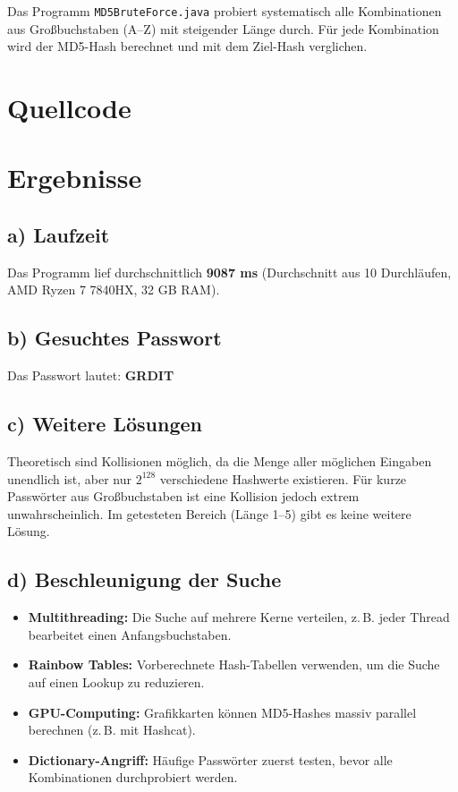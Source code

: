 \documentclass[
	fontsize=12pt,
	paper=a4,
	numbers=noenddot,
	listof=totoc,
	listof=entryprefix,
	listof=nochaptergap,
	bibliography=totoc,
	parskip=half,
	openany
]{scrbook}
\begin{document}
Das Programm \texttt{MD5BruteForce.java} probiert systematisch alle Kombinationen aus Großbuchstaben (A--Z) mit steigender Länge durch.
Für jede Kombination wird der MD5-Hash berechnet und mit dem Ziel-Hash verglichen.

\section*{Quellcode}



\section*{Ergebnisse}

\subsection*{a) Laufzeit}

Das Programm lief durchschnittlich \textbf{9087 ms} (Durchschnitt aus 10 Durchläufen, AMD Ryzen 7 7840HX, 32 GB RAM).

\subsection*{b) Gesuchtes Passwort}

Das Passwort lautet: \textbf{GRDIT}

\subsection*{c) Weitere Lösungen}

Theoretisch sind Kollisionen möglich, da die Menge aller möglichen Eingaben unendlich ist, aber nur $2^{128}$ verschiedene Hashwerte existieren.
Für kurze Passwörter aus Großbuchstaben ist eine Kollision jedoch extrem unwahrscheinlich.
Im getesteten Bereich (Länge 1--5) gibt es keine weitere Lösung.

\subsection*{d) Beschleunigung der Suche}

\begin{itemize}
	\item \textbf{Multithreading:} Die Suche auf mehrere Kerne verteilen, z.\,B. jeder Thread bearbeitet einen Anfangsbuchstaben.
	\item \textbf{Rainbow Tables:} Vorberechnete Hash-Tabellen verwenden, um die Suche auf einen Lookup zu reduzieren.
	\item \textbf{GPU-Computing:} Grafikkarten können MD5-Hashes massiv parallel berechnen (z.\,B. mit Hashcat).
	\item \textbf{Dictionary-Angriff:} Häufige Passwörter zuerst testen, bevor alle Kombinationen durchprobiert werden.
\end{itemize}
\end{document}
